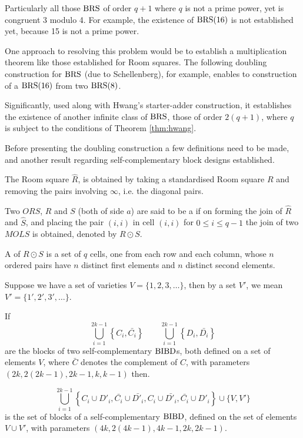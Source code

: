 Particularly all those $\operatorname{BRS}$ of order $q + 1$ where $q$ is not a prime power, yet is congruent 3 modulo 4.
For example, the existence of $\operatorname{BRS}(16)$ is not established yet, because 15 is not a prime power.

One approach to resolving this problem would be to establish a multiplication theorem like those established for Room squares.
The following doubling construction for $\operatorname{BRS}$ (due to Schellenberg), for example, enables to construction of a $\operatorname{BRS}(16)$ from two $\operatorname{BRS}(8)$.

Significantly, used along with Hwang’s starter-adder construction, it establishes the existence of another infinite class of $\operatorname{BRS}$, those of order $2(q + 1)$, where $q$ is subject to the conditions of Theorem \ref{thm:hwang}.

Before presenting the doubling construction a few definitions need to be made, and another result regarding self-complementary block designs established.

The  Room square $\hat{R}$, is obtained by taking a standardised Room square $R$ and removing the pairs involving $\infty$, i.e. the diagonal pairs.

Two $ORS$, $R$ and $S$ (both of side $a$) are said to be a  if on forming the join of $\hat{R}$ and $\hat{S}$, and placing the pair $(i, i)$ in cell $(i, i)$ for $0 \leq i \leq q - 1$ the join of two $MOLS$ is obtained, denoted by $R \odot S$.

A  of $R \odot S$ is a set of $q$ cells, one from each row and each column, whose $n$ ordered pairs have $n$ distinct first elements and $n$ distinct second elements.

Suppose we have a set of varieties $V = \{1, 2, 3, \ldots\}$, then by a set $V'$, we mean $V'=\{1', 2', 3', \ldots\}$.

\begin{lemma}
If
\begin{equation}
  \bigcup\limits_{i=1}^{2k-1} \left \{C_i,\bar{C_i} \right \} 
  \qquad \bigcup\limits_{i=1}^{2k-1} \left \{D_i,\bar{D_i} \right \}
\end{equation}
are the blocks of two self-complementary $\operatorname{BIBD}$s, both defined on a set of elements $V$, where $\bar{C}$ denotes the complement of $C$, with parameters $(2k, 2(2k - 1), 2k - 1, k, k-1)$ then.

\begin{equation}
\bigcup\limits_{i=1}^{2k-1} \left \{C_i \cup D'_i, \bar{C_i} \cup \bar{D'_i}, C_i \cup \bar{D'_i}, \bar{C_i} \cup D'_i  \right \} \cup \{V,V'\}
\end{equation}
is the set of blocks of a self-complementary $\operatorname{BIBD}$, defined on the set of elements $V \cup V'$, with parameters $(4k, 2(4k - 1), 4k - 1, 2k, 2k - 1)$.
\end{lemma}

